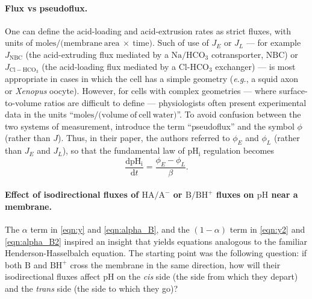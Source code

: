 \documentclass[fleqn,10pt]{physiome}
\begin{document}
\paragraph{Flux vs pseudoflux.}

One can define the acid-loading and acid-extrusion rates as strict fluxes, with units of $\mathrm{moles/(membrane~area~\times~time})$. Such of use of $J_E$ or $J_L$ --- for example $J_\mathrm{NBC}$ (the acid-extruding flux mediated by a $\mathrm{Na}/\mathrm{HCO_3}$ cotransporter, $\mathrm{NBC}$) or $J_\mathrm{Cl-HCO_3}$ (the acid-loading flux mediated by a $\mathrm{Cl}$-$\mathrm{HCO_3}$ exchanger) --- is most appropriate in cases in which the cell has a simple geometry (\emph{e.g.}, a squid axon or \emph{Xenopus} oocyte). However, for cells with complex geometries --- where surface-to-volume ratios are difficult to define --- physiologists often present experimental data in the units ``$\mathrm{moles/(volume~of~cell~water})$''. To avoid confusion between the two systems of measurement, \cite{bevensee1995} introduce the term ``pseudoflux'' and the symbol $\phi$ (rather than $J$). Thus, in their paper, the authors referred to $\phi_E$ and $\phi_L$ (rather than $J_E$ and $J_L$), so that the fundamental law of $\mathrm{pH_i}$ regulation becomes
\begin{equation}
\dfrac{\mathrm{dpH_i}}{\mathrm{d}t}=\dfrac{\phi_E-\phi_L}{\beta}.
\label{eqn:fund3}
\end{equation}

\paragraph{Effect of isodirectional fluxes of $\mathrm{HA}/\mathrm{A^-}$ or $\mathrm{B}/\mathrm{BH^+}$ fluxes on $\mathrm{pH}$ near a membrane.}

The $\alpha$ term in \autoref{eqn:y} and \autoref{eqn:alpha_B}, and the $(1-\alpha)$ term in \autoref{eqn:y2} and \autoref{eqn:alpha_B2} inspired an insight that yields equations analogous to the familiar Henderson-Hasselbalch equation. The starting point was the following question: if both $\mathrm{B}$ and $\mathrm{BH^+}$ cross the membrane in the same direction, how will their isodirectional fluxes affect $\mathrm{pH}$ on the \emph{cis} side (the side from which they depart) and the \emph{trans} side (the side to which they go)?
\end{document}
